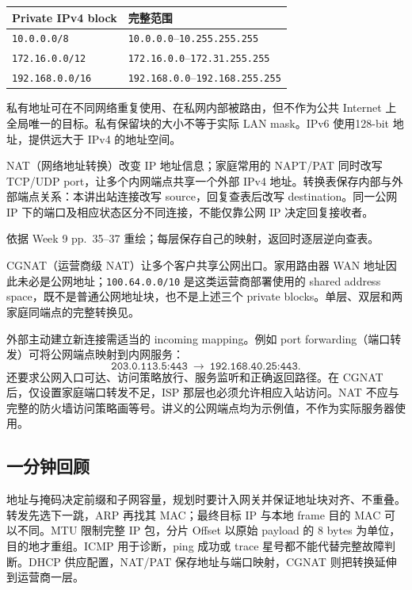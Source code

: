 \begin{center}
\small
\begin{tabular}{@{}ll@{}}
\toprule
Private IPv4 block & 完整范围 \\
\midrule
\texttt{10.0.0.0/8} & \texttt{10.0.0.0}--\texttt{10.255.255.255} \\
\texttt{172.16.0.0/12} & \texttt{172.16.0.0}--\texttt{172.31.255.255} \\
\texttt{192.168.0.0/16} & \texttt{192.168.0.0}--\texttt{192.168.255.255} \\
\bottomrule
\end{tabular}
\end{center}

私有地址可在不同网络重复使用、在私网内部被路由，但不作为公共 Internet 上全局唯一的目标。私有保留块的大小不等于实际 LAN mask。IPv6 使用128-bit 地址，提供远大于 IPv4 的地址空间。

NAT（网络地址转换）改变 IP 地址信息；家庭常用的 NAPT/PAT 同时改写 TCP/UDP port，让多个内网端点共享一个外部 IPv4 地址。转换表保存内部与外部端点关系：本讲出站连接改写 source，回复查表后改写 destination。同一公网 IP 下的端口及相应状态区分不同连接，不能仅靠公网 IP 决定回复接收者。

\begin{center}
\begin{minipage}{\linewidth}
\centering


\small 依据 Week 9 pp.~35--37 重绘；每层保存自己的映射，返回时逐层逆向查表。
\end{minipage}
\end{center}

CGNAT（运营商级 NAT）让多个客户共享公网出口。家用路由器 WAN 地址因此未必是公网地址；\texttt{100.64.0.0/10} 是这类运营商部署使用的 shared address space，既不是普通公网地址块，也不是上述三个 private blocks。单层、双层和两家庭同端点的完整转换见。

外部主动建立新连接需适当的 incoming mapping。例如 port forwarding（端口转发）可将公网端点映射到内网服务：
\[
 \texttt{203.0.113.5:443}\ \longrightarrow\ \texttt{192.168.40.25:443}.
\]
还要求公网入口可达、访问策略放行、服务监听和正确返回路径。在 CGNAT 后，仅设置家庭端口转发不足，ISP 那层也必须允许相应入站访问。NAT 不应与完整的防火墙访问策略画等号。讲义的公网端点均为示例值，不作为实际服务器使用。

\subsection{一分钟回顾}

地址与掩码决定前缀和子网容量，规划时要计入网关并保证地址块对齐、不重叠。转发先选下一跳，ARP 再找其 MAC；最终目标 IP 与本地 frame 目的 MAC 可以不同。MTU 限制完整 IP 包，分片 Offset 以原始 payload 的 8 bytes 为单位，目的地才重组。ICMP 用于诊断，ping 成功或 trace 星号都不能代替完整故障判断。DHCP 供应配置，NAT/PAT 保存地址与端口映射，CGNAT 则把转换延伸到运营商一层。
\endgroup
